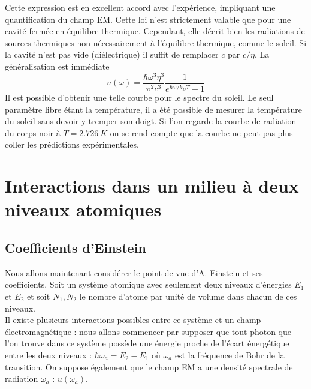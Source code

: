 	Cette expression est en excellent accord avec l'expérience, impliquant une quantification du champ EM. 
	Cette loi n'est strictement valable que pour une cavité fermée en équilibre thermique. Cependant, elle 
	décrit bien les radiations de sources thermiques non nécessairement à l'équilibre thermique, comme le 
	soleil. Si la cavité n'est pas vide (diélectrique) il suffit de remplacer $c$ par $c/\eta$. La 
	généralisation est immédiate
	\begin{equation}
	u(\omega) = \dfrac{\hbar\omega^3\eta^3}{\pi^2c^3}\dfrac{1}{e^{\hbar\omega/k_BT}-1}
	\end{equation}
	Il est possible d'obtenir une telle courbe pour le spectre du soleil. Le seul paramètre libre étant la 
	température, il a été possible de mesurer la température du soleil sans devoir y tremper son doigt. Si 
	l'on regarde la courbe de radiation du corps noir à $T=2.726\ K$ on se rend compte que la courbe 
	ne peut pas plus coller les prédictions expérimentales.
	
	
	
	\newpage
	\section{Interactions dans un milieu à deux niveaux atomiques}
	\subsection{Coefficients d'Einstein}
	Nous allons maintenant considérer le point de vue d'A. Einstein et ses coefficients. Soit 
	un système atomique avec seulement deux niveaux d'énergies $E_1$ et $E_2$ et soit $N_1,N_2$ 
	le nombre d'atome par unité de volume dans chacun de ces niveaux. \\
	
	Il existe plusieurs interactions possibles entre ce système et un champ électromagnétique : 
	nous allons commencer par supposer que tout photon que l'on trouve dans ce système possède 
	une énergie proche de l'écart énergétique entre les deux niveaux : $\hbar\omega_a=E_2-E_1$ où 
	$\omega_a$ est la fréquence de Bohr de la transition. On suppose également que le champ EM 
	a une densité spectrale de radiation $\omega_a$ : $u(\omega_a)$. \\
	
